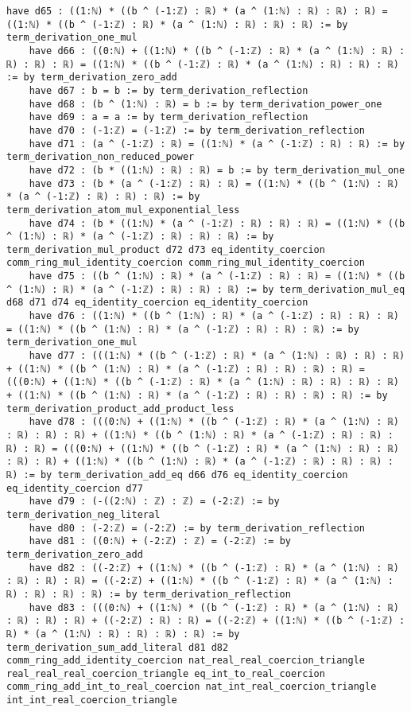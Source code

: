 \documentclass{article}
\begin{document}
\begin{tcolorbox}[colback=white!10, width=\linewidth]
\begin{lstlisting}[language=Lean4]
    have d65 : ((1:ℕ) * ((b ^ (-1:ℤ) : ℝ) * (a ^ (1:ℕ) : ℝ) : ℝ) : ℝ) = ((1:ℕ) * ((b ^ (-1:ℤ) : ℝ) * (a ^ (1:ℕ) : ℝ) : ℝ) : ℝ) := by term_derivation_one_mul
    have d66 : ((0:ℕ) + ((1:ℕ) * ((b ^ (-1:ℤ) : ℝ) * (a ^ (1:ℕ) : ℝ) : ℝ) : ℝ) : ℝ) = ((1:ℕ) * ((b ^ (-1:ℤ) : ℝ) * (a ^ (1:ℕ) : ℝ) : ℝ) : ℝ) := by term_derivation_zero_add
    have d67 : b = b := by term_derivation_reflection
    have d68 : (b ^ (1:ℕ) : ℝ) = b := by term_derivation_power_one
    have d69 : a = a := by term_derivation_reflection
    have d70 : (-1:ℤ) = (-1:ℤ) := by term_derivation_reflection
    have d71 : (a ^ (-1:ℤ) : ℝ) = ((1:ℕ) * (a ^ (-1:ℤ) : ℝ) : ℝ) := by term_derivation_non_reduced_power
    have d72 : (b * ((1:ℕ) : ℝ) : ℝ) = b := by term_derivation_mul_one
    have d73 : (b * (a ^ (-1:ℤ) : ℝ) : ℝ) = ((1:ℕ) * ((b ^ (1:ℕ) : ℝ) * (a ^ (-1:ℤ) : ℝ) : ℝ) : ℝ) := by term_derivation_atom_mul_exponential_less
    have d74 : (b * ((1:ℕ) * (a ^ (-1:ℤ) : ℝ) : ℝ) : ℝ) = ((1:ℕ) * ((b ^ (1:ℕ) : ℝ) * (a ^ (-1:ℤ) : ℝ) : ℝ) : ℝ) := by term_derivation_mul_product d72 d73 eq_identity_coercion comm_ring_mul_identity_coercion comm_ring_mul_identity_coercion
    have d75 : ((b ^ (1:ℕ) : ℝ) * (a ^ (-1:ℤ) : ℝ) : ℝ) = ((1:ℕ) * ((b ^ (1:ℕ) : ℝ) * (a ^ (-1:ℤ) : ℝ) : ℝ) : ℝ) := by term_derivation_mul_eq d68 d71 d74 eq_identity_coercion eq_identity_coercion
    have d76 : ((1:ℕ) * ((b ^ (1:ℕ) : ℝ) * (a ^ (-1:ℤ) : ℝ) : ℝ) : ℝ) = ((1:ℕ) * ((b ^ (1:ℕ) : ℝ) * (a ^ (-1:ℤ) : ℝ) : ℝ) : ℝ) := by term_derivation_one_mul
    have d77 : (((1:ℕ) * ((b ^ (-1:ℤ) : ℝ) * (a ^ (1:ℕ) : ℝ) : ℝ) : ℝ) + ((1:ℕ) * ((b ^ (1:ℕ) : ℝ) * (a ^ (-1:ℤ) : ℝ) : ℝ) : ℝ) : ℝ) = (((0:ℕ) + ((1:ℕ) * ((b ^ (-1:ℤ) : ℝ) * (a ^ (1:ℕ) : ℝ) : ℝ) : ℝ) : ℝ) + ((1:ℕ) * ((b ^ (1:ℕ) : ℝ) * (a ^ (-1:ℤ) : ℝ) : ℝ) : ℝ) : ℝ) := by term_derivation_product_add_product_less
    have d78 : (((0:ℕ) + ((1:ℕ) * ((b ^ (-1:ℤ) : ℝ) * (a ^ (1:ℕ) : ℝ) : ℝ) : ℝ) : ℝ) + ((1:ℕ) * ((b ^ (1:ℕ) : ℝ) * (a ^ (-1:ℤ) : ℝ) : ℝ) : ℝ) : ℝ) = (((0:ℕ) + ((1:ℕ) * ((b ^ (-1:ℤ) : ℝ) * (a ^ (1:ℕ) : ℝ) : ℝ) : ℝ) : ℝ) + ((1:ℕ) * ((b ^ (1:ℕ) : ℝ) * (a ^ (-1:ℤ) : ℝ) : ℝ) : ℝ) : ℝ) := by term_derivation_add_eq d66 d76 eq_identity_coercion eq_identity_coercion d77
    have d79 : (-((2:ℕ) : ℤ) : ℤ) = (-2:ℤ) := by term_derivation_neg_literal
    have d80 : (-2:ℤ) = (-2:ℤ) := by term_derivation_reflection
    have d81 : ((0:ℕ) + (-2:ℤ) : ℤ) = (-2:ℤ) := by term_derivation_zero_add
    have d82 : ((-2:ℤ) + ((1:ℕ) * ((b ^ (-1:ℤ) : ℝ) * (a ^ (1:ℕ) : ℝ) : ℝ) : ℝ) : ℝ) = ((-2:ℤ) + ((1:ℕ) * ((b ^ (-1:ℤ) : ℝ) * (a ^ (1:ℕ) : ℝ) : ℝ) : ℝ) : ℝ) := by term_derivation_reflection
    have d83 : (((0:ℕ) + ((1:ℕ) * ((b ^ (-1:ℤ) : ℝ) * (a ^ (1:ℕ) : ℝ) : ℝ) : ℝ) : ℝ) + ((-2:ℤ) : ℝ) : ℝ) = ((-2:ℤ) + ((1:ℕ) * ((b ^ (-1:ℤ) : ℝ) * (a ^ (1:ℕ) : ℝ) : ℝ) : ℝ) : ℝ) := by term_derivation_sum_add_literal d81 d82 comm_ring_add_identity_coercion nat_real_real_coercion_triangle real_real_real_coercion_triangle eq_int_to_real_coercion comm_ring_add_int_to_real_coercion nat_int_real_coercion_triangle int_int_real_coercion_triangle

\end{lstlisting}
\end{tcolorbox}
\end{document}
